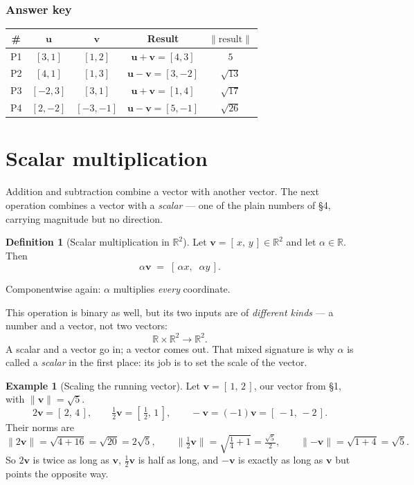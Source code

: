 \documentclass[11pt]{article}
\theoremstyle{definition}
\newtheorem{defn}{Definition}[section]
\newtheorem{ex}{Example}[section]
\theoremstyle{remark}
\newcommand{\R}{\mathbb{R}}
\newcommand{\vc}[1]{\mathbf{#1}}
\newcommand{\norm}[1]{\lVert #1\rVert}
\begin{document}
\subsubsection*{Answer key}
\begin{center}
\renewcommand{\arraystretch}{1.3}
\begin{tabular}{@{}c c c c c@{}}
\toprule
\textbf{\#} & $\vc{u}$ & $\vc{v}$ & \textbf{Result} & $\norm{\text{result}}$ \\
\midrule
P1 & $[3,1]$   & $[1,2]$    & $\vc{u}+\vc{v}=[4,3]$   & $5$ \\
P2 & $[4,1]$   & $[1,3]$    & $\vc{u}-\vc{v}=[3,-2]$  & $\sqrt{13}$ \\
P3 & $[-2,3]$  & $[3,1]$    & $\vc{u}+\vc{v}=[1,4]$   & $\sqrt{17}$ \\
P4 & $[2,-2]$  & $[-3,-1]$  & $\vc{u}-\vc{v}=[5,-1]$  & $\sqrt{26}$ \\
\bottomrule
\end{tabular}
\end{center}

\section{Scalar multiplication}
Addition and subtraction combine a vector with another vector. The next
operation combines a vector with a \emph{scalar} --- one of the plain numbers of
\S4, carrying magnitude but no direction.

\begin{defn}[Scalar multiplication in $\R^2$]
Let $\vc{v}=[\,x,\,y\,]\in\R^{2}$ and let $\alpha\in\R$. Then
\[
  \alpha\vc{v} \;=\; [\,\alpha x,\;\;\alpha y\,].
\]
\end{defn}

\noindent Componentwise again: $\alpha$ multiplies \emph{every} coordinate.

\smallskip
\noindent This operation is binary as well, but its two inputs are of
\emph{different kinds} --- a number and a vector, not two vectors:
\[
  \R\times\R^{2}\to\R^{2}.
\]
A scalar and a vector go in; a vector comes out. That mixed signature is why
$\alpha$ is called a \emph{scalar} in the first place: its job is to set the
scale of the vector.

\begin{ex}[Scaling the running vector]
Let $\vc{v}=[\,1,\,2\,]$, our vector from \S1, with $\norm{\vc{v}}=\sqrt{5}$.
\[
  2\vc{v}=[\,2,\,4\,],
  \qquad
  \tfrac12\vc{v}=[\,\tfrac12,\,1\,],
  \qquad
  -\vc{v}=(-1)\vc{v}=[\,-1,\,-2\,].
\]
Their norms are
\[
  \norm{2\vc{v}}=\sqrt{4+16}=\sqrt{20}=2\sqrt5,
  \qquad
  \norm{\tfrac12\vc{v}}=\sqrt{\tfrac14+1}=\tfrac{\sqrt5}{2},
  \qquad
  \norm{-\vc{v}}=\sqrt{1+4}=\sqrt5 .
\]
So $2\vc{v}$ is twice as long as $\vc{v}$, $\tfrac12\vc{v}$ is half as long, and
$-\vc{v}$ is exactly as long as $\vc{v}$ but points the opposite way.
\end{ex}
\end{document}
